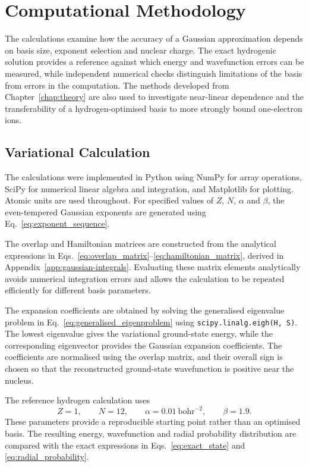 
\chapter{Computational Methodology}
\label{chap:methodology}

The calculations examine how the accuracy of a Gaussian approximation depends on basis size, exponent selection and nuclear charge. The exact hydrogenic solution provides a reference against which energy and wavefunction errors can be measured, while independent numerical checks distinguish limitations of the basis from errors in the computation. The methods developed from Chapter~\ref{chap:theory} are also used to investigate near-linear dependence and the transferability of a hydrogen-optimised basis to more strongly bound one-electron ions.




\section{Variational Calculation}

The calculations were implemented in Python using NumPy for array operations, SciPy for numerical linear algebra and integration, and Matplotlib for plotting. Atomic units are used throughout. For specified values of $Z$, $N$, $\alpha$ and $\beta$, the even-tempered Gaussian exponents are generated using Eq.~\eqref{eq:exponent_sequence}.

The overlap and Hamiltonian matrices are constructed from the analytical expressions in Eqs.~\eqref{eq:overlap_matrix}--\eqref{eq:hamiltonian_matrix}, derived in Appendix~\ref{app:gaussian-integrals}. Evaluating these matrix elements analytically avoids numerical integration errors and allows the calculation to be repeated efficiently for different basis parameters.

The expansion coefficients are obtained by solving the generalised eigenvalue problem in Eq.~\eqref{eq:generalised_eigenproblem} using \texttt{scipy.linalg.eigh(H, S)}. The lowest eigenvalue gives the variational ground-state energy, while the corresponding eigenvector provides the Gaussian expansion coefficients. The coefficients are normalised using the overlap matrix, and their overall sign is chosen so that the reconstructed ground-state wavefunction is positive near the nucleus.

The reference hydrogen calculation uses
\begin{equation}
    Z=1,\qquad N=12,\qquad
    \alpha=0.01\ \mathrm{bohr}^{-2},
    \qquad \beta=1.9.
    \label{eq:reference_parameters}
\end{equation}
These parameters provide a reproducible starting point rather than an optimised basis. The resulting energy, wavefunction and radial probability distribution are compared with the exact expressions in Eqs.~\eqref{eq:exact_state} and \eqref{eq:radial_probability}.

